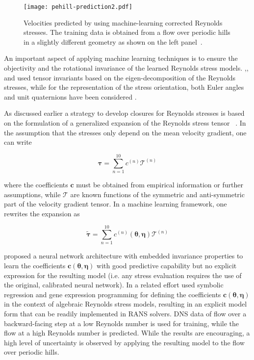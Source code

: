 \documentclass[a4paper]{ar-1col}
\begin{document}
\begin{figure}[!htbp]
  \centering
\texttt{[image: pehill-prediction2.pdf]}
  \caption{Velocities predicted by using machine-learning corrected Reynolds stresses. The training data is obtained from a flow over periodic hills in a slightly different geometry as shown on the left panel~\citep{wu2018data-driven}.}
  \label{fig:wu-results}
\end{figure}

An important aspect of applying machine learning techniques is to ensure the objectivity and 
 the rotational invariance of the learned Reynolds stress models. \citet{tracey2013application},\citet{wang2017physics-informed}, and \citet{wu2018data-driven} used tensor invariants based on the eigen-decomposition of the Reynolds stresses, while for the representation of the stress orientation, both Euler angles and unit quaternions have been considered \citep{wu2017representation}.

As discussed earlier a strategy to develop closures for Reynolds stresses is based on the formulation of a generalized expansion of the Reynolds stress tensor ~\citep{pope75more}. In the assumption that the
stresses only depend on the mean velocity gradient, one can write

 \begin{equation}
\label{eq:astm}
  {\boldsymbol{\tau}} = \sum_{n=1}^{10}c^{(n)}\mathbf{\bm{\mathcal{T}}}^{(n)}
  \end{equation}
  
 \noindent where the coefficients $\bm{c}$ must be obtained from empirical information or further assumptions, while $\bm{\mathcal{T}}$ are known functions of the symmetric and anti-symmetric part of the velocity gradient tensor. In a machine learning framework, one rewrites the expansion as
 
 \begin{equation}
\label{eq:astm}
  \widetilde{\boldsymbol{\tau}} = \sum_{n=1}^{10}c^{(n)}(\bm{\theta},\bm{\eta})\mathbf{\bm{\mathcal{T}}}^{(n)}
  \end{equation}

 \citet{ling2016reynolds} proposed a neural network architecture with embedded invariance properties to learn the coefficients $\bm{c}(\bm{\theta},\bm{\eta})$ with good
 predictive capability but no explicit expression for the resulting model (i.e. any stress evaluation requires the use of the original, calibrated neural network).  In a related effort 
\cite{weatheritt2016novel,weatheritt2017development} used symbolic regression and gene expression programming for defining the coefficients $\bm{c}(\bm{\theta},\bm{\eta})$ in the context of algebraic Reynolds stress models, resulting
in an explicit model form  that can be readily implemented in RANS solvers.  DNS data of flow over a backward-facing step at a low Reynolds number is used for training, while
the flow at a high Reynolds number is predicted. While the results are encouraging, a high level of uncertainty is  observed by applying the resulting model
to the flow over periodic hills. 
\end{document}
